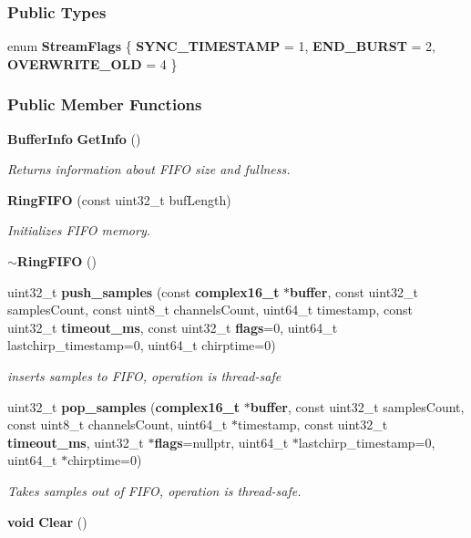 \subsubsection*{Public Types}
\begin{DoxyCompactItemize}
\item 
enum {\bf Stream\+Flags} \{ {\bf S\+Y\+N\+C\+\_\+\+T\+I\+M\+E\+S\+T\+A\+MP} = 1, 
{\bf E\+N\+D\+\_\+\+B\+U\+R\+ST} = 2, 
{\bf O\+V\+E\+R\+W\+R\+I\+T\+E\+\_\+\+O\+LD} = 4
 \}
\end{DoxyCompactItemize}
\subsubsection*{Public Member Functions}
\begin{DoxyCompactItemize}
\item 
{\bf Buffer\+Info} {\bf Get\+Info} ()
\begin{DoxyCompactList}\small\item\em Returns information about F\+I\+FO size and fullness. \end{DoxyCompactList}\item 
{\bf Ring\+F\+I\+FO} (const uint32\+\_\+t buf\+Length)
\begin{DoxyCompactList}\small\item\em Initializes F\+I\+FO memory. \end{DoxyCompactList}\item 
{\bf $\sim$\+Ring\+F\+I\+FO} ()
\item 
uint32\+\_\+t {\bf push\+\_\+samples} (const {\bf complex16\+\_\+t} $\ast${\bf buffer}, const uint32\+\_\+t samples\+Count, const uint8\+\_\+t channels\+Count, uint64\+\_\+t timestamp, const uint32\+\_\+t {\bf timeout\+\_\+ms}, const uint32\+\_\+t {\bf flags}=0, uint64\+\_\+t lastchirp\+\_\+timestamp=0, uint64\+\_\+t chirptime=0)
\begin{DoxyCompactList}\small\item\em inserts samples to F\+I\+FO, operation is thread-\/safe \end{DoxyCompactList}\item 
uint32\+\_\+t {\bf pop\+\_\+samples} ({\bf complex16\+\_\+t} $\ast${\bf buffer}, const uint32\+\_\+t samples\+Count, const uint8\+\_\+t channels\+Count, uint64\+\_\+t $\ast$timestamp, const uint32\+\_\+t {\bf timeout\+\_\+ms}, uint32\+\_\+t $\ast${\bf flags}=nullptr, uint64\+\_\+t $\ast$lastchirp\+\_\+timestamp=0, uint64\+\_\+t $\ast$chirptime=0)
\begin{DoxyCompactList}\small\item\em Takes samples out of F\+I\+FO, operation is thread-\/safe. \end{DoxyCompactList}\item 
{\bf void} {\bf Clear} ()
\end{DoxyCompactItemize}
